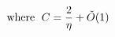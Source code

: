 \documentclass[preview]{standalone}
\begin{document}
\begin{align*}
\special{dvisvgm:raw <g id='unique000'>}\text{where }\; C = \frac{2}{\eta} + \tilde{O}(1)\special{dvisvgm:raw </g>}
\end{align*}
\end{document}
